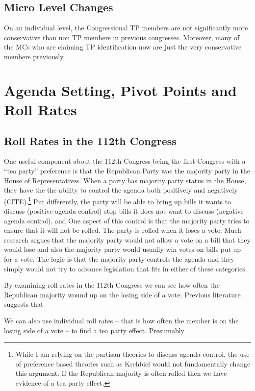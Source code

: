 \documentclass[12pt]{article}
\begin{document}
\subsection{Micro Level Changes}
On an individual level, the Congressional TP members are not significantly more conservative than non TP members in previous congresses. Moreover, many of the MCs who are claiming TP identification now are just the very conservative members previously.

\section{Agenda Setting, Pivot Points and Roll Rates}

\subsection{Roll Rates in the 112th Congress}
One useful component about the 112th Congress being the first Congress with a ``tea party'' preference is that the Republican Party was the majority party in the House of Representatives.
When a party has majority party status in the House, they have the the ability to control the agenda both positively and negatively (CITE).\footnote{While I am relying on the partisan theories to discuss agenda control, the use of preference based theories such as Krehbiel would not fundamentally change this argument. If the Republican majority is often rolled then we have evidence of a tea party effect.} Put differently, the party will be able to bring up bills it wants to discuss (positive agenda control) stop bills it does not want to discuss (negative agenda control). and  One aspect of this control is that the majority party tries to ensure that it will not be rolled. The party is rolled when it loses a vote. Much research argues that the majority party would not allow a vote on a bill that they would lose and also the majority party would usually win votes on bills put up for a vote. The logic is that the majority party controls the agenda and they simply would not try to advance legislation that fits in either of these categories.

By examining roll rates in the 112th Congress we can see how often the Republican majority wound up on the losing side of a vote. Previous literature suggests that 

We can also use individual roll rates -- that is how often the member is on the losing side of a vote -- to find a tea party effect. Presumably 
\end{document}
